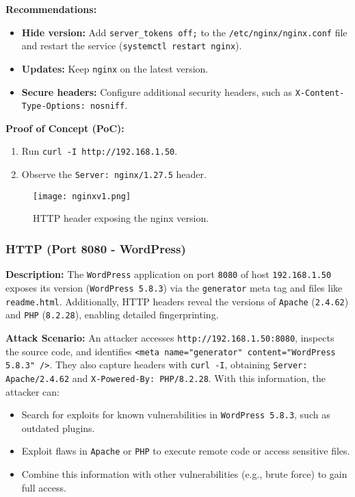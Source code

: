 \documentclass[a4paper,12pt]{article}
\begin{document}
\textbf{Recommendations:}  
\begin{itemize}
    \item \textbf{Hide version:} Add \texttt{server\_tokens off;} to the \texttt{/etc/nginx/nginx.conf} file and restart the service (\texttt{systemctl restart nginx}).  
    \item \textbf{Updates:} Keep \texttt{nginx} on the latest version.  
    \item \textbf{Secure headers:} Configure additional security headers, such as \texttt{X-Content-Type-Options: nosniff}.  
\end{itemize}

\textbf{Proof of Concept (PoC):}  
\begin{enumerate}
    \item Run \texttt{curl -I http://192.168.1.50}.  
    \item Observe the \texttt{Server: nginx/1.27.5} header.  
\end{enumerate}

\begin{figure}[ht]
    \centering
    \texttt{[image: nginxv1.png]}
    \caption{HTTP header exposing the nginx version.}
\end{figure}

\clearpage

\subsubsection{HTTP (Port 8080 - WordPress)}
\textbf{Description:}  
The \texttt{WordPress} application on port \texttt{8080} of host \texttt{192.168.1.50} exposes its version (\texttt{WordPress 5.8.3}) via the \texttt{generator} meta tag and files like \texttt{readme.html}. Additionally, HTTP headers reveal the versions of \texttt{Apache} (\texttt{2.4.62}) and \texttt{PHP} (\texttt{8.2.28}), enabling detailed fingerprinting.

\textbf{Attack Scenario:}  
An attacker accesses \texttt{http://192.168.1.50:8080}, inspects the source code, and identifies \texttt{<meta name="generator" content="WordPress 5.8.3" />}. They also capture headers with \texttt{curl -I}, obtaining \texttt{Server: Apache/2.4.62} and \texttt{X-Powered-By: PHP/8.2.28}. With this information, the attacker can:  
\begin{itemize}
    \item Search for exploits for known vulnerabilities in \texttt{WordPress 5.8.3}, such as outdated plugins.  
    \item Exploit flaws in \texttt{Apache} or \texttt{PHP} to execute remote code or access sensitive files.  
    \item Combine this information with other vulnerabilities (e.g., brute force) to gain full access.  
\end{itemize}
\end{document}
